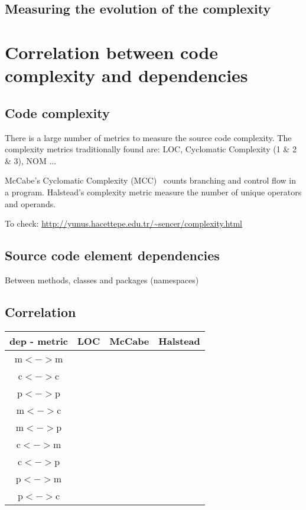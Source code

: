 \documentclass{sig-alternate}
\begin{document}
\subsection{Measuring the evolution of the complexity}


\section{Correlation between code complexity and dependencies}

\subsection{Code complexity}
There is a large number of metrics to measure the source code complexity.
The complexity metrics traditionally found are: LOC, Cyclomatic Complexity (1 \& 2 \& 3), NOM ...

McCabe's Cyclomatic Complexity (MCC)~\cite{McCa76a} counts branching and control flow in a program.
Halstead's complexity metric measure the number of unique operators and operands. 


To check: \url{http://yunus.hacettepe.edu.tr/~sencer/complexity.html}
\subsection{Source code element dependencies}

Between methods, classes and packages (namespaces)

\subsection{Correlation}

\begin{tabular}{|c|c|c|c|}\hline
dep - metric  & LOC & McCabe & Halstead\\\hline
m$<->$m	&	& & \\\hline
c$<->$c	&	& & \\\hline
p$<->$p	&	& & \\\hline
m$<->$c	&	& & \\\hline
m$<->$p	&	& & \\\hline
c$<->$m	&	& & \\\hline
c$<->$p	&	& & \\\hline
p$<->$m	&	& & \\\hline
p$<->$c	&	& & \\\hline
\end{tabular}
\end{document}
